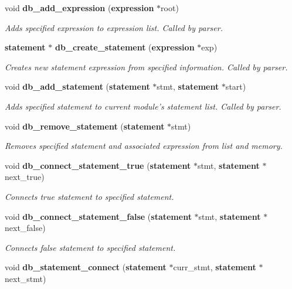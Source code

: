 \begin{CompactItemize}
void {\bf db\_\-add\_\-expression} ({\bf expression} $\ast$root)
\begin{CompactList}\small\item\em Adds specified expression to expression list. Called by parser. \item\end{CompactList}\item 
{\bf statement} $\ast$ {\bf db\_\-create\_\-statement} ({\bf expression} $\ast$exp)
\begin{CompactList}\small\item\em Creates new statement expression from specified information. Called by parser. \item\end{CompactList}\item 
void {\bf db\_\-add\_\-statement} ({\bf statement} $\ast$stmt, {\bf statement} $\ast$start)
\begin{CompactList}\small\item\em Adds specified statement to current module's statement list. Called by parser. \item\end{CompactList}\item 
void {\bf db\_\-remove\_\-statement} ({\bf statement} $\ast$stmt)
\begin{CompactList}\small\item\em Removes specified statement and associated expression from list and memory. \item\end{CompactList}\item 
void {\bf db\_\-connect\_\-statement\_\-true} ({\bf statement} $\ast$stmt, {\bf statement} $\ast$next\_\-true)
\begin{CompactList}\small\item\em Connects true statement to specified statement. \item\end{CompactList}\item 
void {\bf db\_\-connect\_\-statement\_\-false} ({\bf statement} $\ast$stmt, {\bf statement} $\ast$next\_\-false)
\begin{CompactList}\small\item\em Connects false statement to specified statement. \item\end{CompactList}\item 
void {\bf db\_\-statement\_\-connect} ({\bf statement} $\ast$curr\_\-stmt, {\bf statement} $\ast$next\_\-stmt)

\end{CompactItemize}
